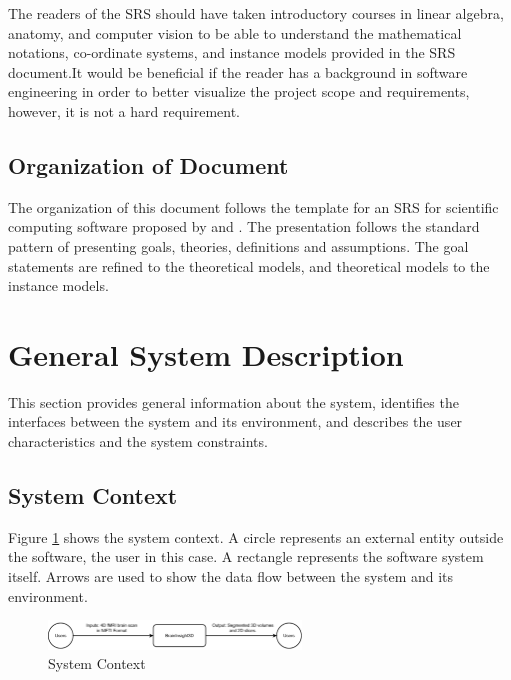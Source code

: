 \documentclass[12pt]{article}
\begin{document}
The readers of the SRS should have taken introductory courses in linear algebra, anatomy,
and computer vision to be able to understand the mathematical notations, co-ordinate systems,
and instance models provided in the SRS document.It would be beneficial if the reader has a
background in software engineering in order to better visualize the project scope and requirements,
however, it is not a hard requirement.

\subsection{Organization of Document}

The organization of this document follows the template for an SRS for
scientific computing software proposed by \cite{Koothoor2013} and
\cite{SmithAndLai2005}. The presentation follows the standard pattern of presenting goals, theories, definitions and
assumptions. The goal statements are refined to the theoretical models, and
theoretical models to the instance models.


\section{General System Description}
This section provides general information about the system, identifies the
interfaces between the system and its environment, and describes the user
characteristics and the system constraints.


\subsection{System Context}

Figure \ref{SystemContext} shows the system context.  A circle represents an
external entity outside the software, the user in this case.  A rectangle
represents the software system itself.  Arrows are used to show the data
flow between the system and its environment.
\newline\newline\newline

\begin{figure}[h!]
  \begin{center}
    \includegraphics[width=0.6\textwidth]{SystemContext}
    \caption{System Context}
    \label{SystemContext}
  \end{center}
\end{figure}
\end{document}
